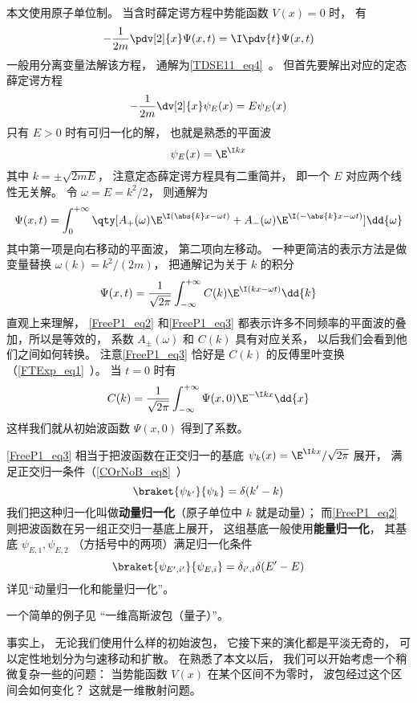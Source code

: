 

本文使用原子单位制。 当含时薛定谔方程中势能函数 $V(x) = 0$ 时， 有
\begin{equation}\label{FreeP1_eq1}
-\frac{1}{2m}\pdv[2]{x}\Psi(x,t) = \I \pdv{t} \Psi(x,t)
\end{equation}
一般用分离变量法解该方程， 通解为\autoref{TDSE11_eq4}~。 但首先要解出对应的定态薛定谔方程
\begin{equation}
-\frac{1}{2m}\dv[2]{x}\psi_E(x) = E \psi_E(x)
\end{equation}
只有 $E > 0$ 时有可归一化的解， 也就是熟悉的平面波
\begin{equation}
\psi_E(x) = \E^{\I k x}
\end{equation}
其中 $k = \pm\sqrt{2mE}$， 注意定态薛定谔方程具有二重简并， 即一个 $E$ 对应两个线性无关解。 令 $\omega = E = k^2/2$， 则通解为
\begin{equation}\label{FreeP1_eq2}
\Psi(x,t) = \int_{0}^{+\infty} \qty[A_+(\omega) \E^{\I (\abs{k}x - \omega t)} + A_-(\omega) \E^{\I (-\abs{k}x - \omega t)}] \dd{\omega}
\end{equation}
其中第一项是向右移动的平面波， 第二项向左移动。 一种更简洁的表示方法是做变量替换 $\omega(k) = k^2/(2m)$， 把通解记为关于 $k$ 的积分
\begin{equation}\label{FreeP1_eq3}
\Psi(x,t) = \frac{1}{\sqrt{2\pi}} \int_{-\infty}^{+\infty} C(k) \E^{\I (k x - \omega t)} \dd{k}
\end{equation}
直观上来理解， \autoref{FreeP1_eq2} 和\autoref{FreeP1_eq3} 都表示许多不同频率的平面波的叠加，所以是等效的， 系数 $A_\pm(\omega)$ 和 $C(k)$ 具有对应关系， 以后我们会看到他们之间如何转换。 注意\autoref{FreeP1_eq3} 恰好是 $C(k)$ 的反傅里叶变换（\autoref{FTExp_eq1}~）。 当 $t = 0$ 时有
\begin{equation}
C(k) = \frac{1}{\sqrt{2\pi}} \int_{-\infty}^{+\infty} \Psi(x,0) \E^{-\I k x} \dd{x}
\end{equation}
这样我们就从初始波函数 $\Psi(x,0)$ 得到了系数。

\autoref{FreeP1_eq3} 相当于把波函数在正交归一的基底 $\psi_k(x) = \E^{\I kx}/\sqrt{2\pi}$ 展开， 满足正交归一条件（\autoref{COrNoB_eq8}~）
\begin{equation}
\braket{\psi_{k'}}{\psi_k} = \delta(k' - k)
\end{equation}
我们把这种归一化叫做\textbf{动量归一化}（原子单位中 $k$ 就是动量）； 而\autoref{FreeP1_eq2} 则把波函数在另一组正交归一基底上展开， 这组基底一般使用\textbf{能量归一化}， 其基底 $\psi_{E,1}, \psi_{E,2}$ （方括号中的两项）满足归一化条件
\begin{equation}
\braket{\psi_{E',i'}}{\psi_{E,i}} = \delta_{i',i}\delta(E' - E)
\end{equation}
详见“动量归一化和能量归一化”。

一个简单的例子见 “一维高斯波包（量子）”。

事实上， 无论我们使用什么样的初始波包， 它接下来的演化都是平淡无奇的， 可以定性地划分为匀速移动和扩散。 在熟悉了本文以后， 我们可以开始考虑一个稍微复杂一些的问题： 当势能函数 $V(x)$ 在某个区间不为零时， 波包经过这个区间会如何变化？ 这就是一维散射问题。
